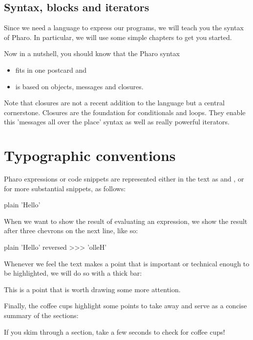 \documentclass[10pt,twoside,english]{_support/latex/sbabook/sbabook}
\begin{document}
\subsection{Syntax, blocks and iterators}
Since we need a language to express our programs, we will teach you the syntax of Pharo. In particular, we will use some simple chapters to get you started. 

Now in a nutshell, you should know that the Pharo syntax

\begin{itemize}
\item fits in one postcard and
\item is based on objects, messages and closures.
\end{itemize}

Note that closures are not a recent addition to the language but a central cornerstone. Closures are the foundation for conditionals and loops.
They enable this 'messages all over the place' syntax as well as really powerful iterators.
\section{Typographic conventions}
Pharo expressions or code snippets are represented either in the text as  and , or for more substantial snippets, as follows:

\begin{displaycode}{plain}
'Hello'
\end{displaycode}

When we want to show the result of evaluating an expression, we show the result after three chevrons \textcode{\textgreater{}\textgreater{}\textgreater{}} on the next line, like so:

\begin{displaycode}{plain}
'Hello' reversed
>>> 'olleH'
\end{displaycode}

Whenever we feel the text makes a point that is important or technical enough to be highlighted, we will do so with a thick bar:

\begin{important}
This is a point that is worth drawing some more attention.
\end{important}

Finally, the coffee cups highlight some points to take away and serve as a concise summary of the sections:

\begin{coffee}
If you skim through a section, take a few seconds to check for coffee cups!
\end{coffee}
\end{document}
